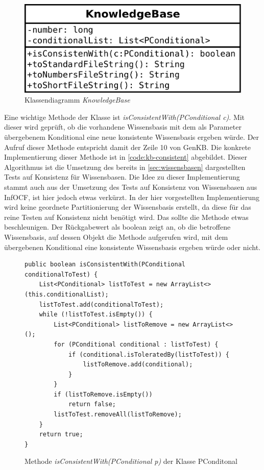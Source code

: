 \documentclass[12pt,a4paper]{article}
\begin{document}
\begin{figure}
\includegraphics[width=0.45\linewidth]{bilder/KnowledgeBase.png}
\caption{Klassendiagramm \textit{KnowledgeBase}}
\label{pic:knowledgebase}
\end{figure}




Eine wichtige Methode der Klasse ist \textit{isConsistentWith(PConditional c)}. Mit dieser wird geprüft, ob die vorhandene Wissensbasis mit dem als Parameter übergebenem Konditional eine neue konsistente Wissensbasis ergeben würde. Der Aufruf dieser Methode entspricht damit der Zeile 10 von GenKB. Die konkrete Implementierung dieser Methode ist in \autoref{code:kb-consistent} abgebildet. Dieser Algorithmus ist die Umsetzung des bereits in \autoref{sec:wissensbasen} dargestellten Tests auf Konsistenz für Wissensbasen.  Die Idee zu dieser Implementierung stammt auch aus der Umsetzung des Tests auf Konsistenz von Wissensbasen aus InfOCF, ist hier jedoch etwas verkürzt. In der hier vorgestellten Implementierung wird keine geordnete Partitionierung der Wissensbasis erstellt, da diese für das reine Testen auf Konsistenz nicht benötigt wird. Das sollte die Methode etwas beschleunigen. Der Rückgabewert als boolean zeigt an, ob die betroffene Wissensbasis, auf dessen Objekt die Methode aufgerufen wird, mit dem übergebenen Konditional eine konsistente Wissensbasis ergeben würde oder nicht. 



\begin{figure}
\begin{lstlisting}
public boolean isConsistentWith(PConditional conditionalToTest) {
    List<PConditional> listToTest = new ArrayList<>(this.conditionalList);
    listToTest.add(conditionalToTest);
    while (!listToTest.isEmpty()) {
        List<PConditional> listToRemove = new ArrayList<>();
        for (PConditional conditional : listToTest) {
            if (conditional.isToleratedBy(listToTest)) {
                listToRemove.add(conditional);
            }
        }
        if (listToRemove.isEmpty())
            return false;
        listToTest.removeAll(listToRemove);
    }
    return true;
}
\end{lstlisting}
\caption{Methode \textit{isConsistentWith(PConditional p)}  der Klasse PConditonal}
\label{code:kb-consistent}
\end{figure} 
\end{document}
